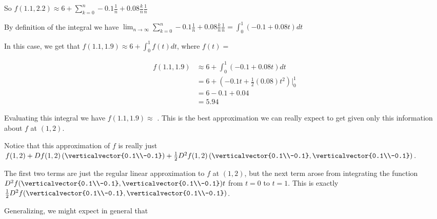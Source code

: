\documentclass{article}
\begin{document}
\begin{question}
\begin{solution}
\begin{hint}
			\end{hint}
			\begin{hint}
				So \(f(1.1,2.2) \approx 6+ \displaystyle\sum_{k=0}^{n} -0.1\frac{1}{n} +0.08\frac{k}{n}\frac{1}{n} \)
			\end{hint}
			\begin{hint}
				By definition of the integral we have \(\displaystyle\lim_{n \to \infty} \displaystyle\sum_{k=0}^{n} -0.1\frac{1}{n} +0.08\frac{k}{n}\frac{1}{n} = \displaystyle\int_0^1 (-0.1+0.08t) dt\)
			\end{hint}
			In this case, we get that $f(1.1,1.9) \approx 6+ \displaystyle\int_0^{1} f(t) dt$, where $f(t)=$
		\end{solution}
		
		\begin{solution}
			\begin{hint}
				\begin{align*}
					f(1.1,1.9) &\approx 6+ \displaystyle\int_0^1 (-0.1+0.08t) dt\\
						&=6+\left(-0.1t+\frac{1}{2}(0.08)t^2 \right)\big|_{0}^{1}\\
						&=6-0.1+0.04\\
						&=5.94
				\end{align*}
			\end{hint}
			Evaluating this integral we have $f(1.1,1.9) \approx $ .  This is the best approximation we can really expect to get given only this
			information about $f$ at $(1,2)$.
		\end{solution}
		
		Notice that this approximation of $f$ is really just 
		$f(1,2)+Df(1,2) \left(\verticalvector{0.1\\-0.1} \right)+ \frac{1}{2} D^2f(1,2)\left( \verticalvector{0.1\\-0.1}, \verticalvector{0.1\\-0.1}\right)$.
		
		The first two terms are just the regular linear approximation to $f$ at $(1,2)$, but the next term arose from integrating the function 
		$D^2f( \verticalvector{0.1\\-0.1},\verticalvector{0.1\\-0.1})t$ from $t=0$ to $t=1$.  This is  exactly
		$\frac{1}{2} D^2f(\verticalvector{0.1\\-0.1},\verticalvector{0.1\\-0.1})$.
		
		Generalizing, we might expect in general that 
		

\end{question}
\end{document}
